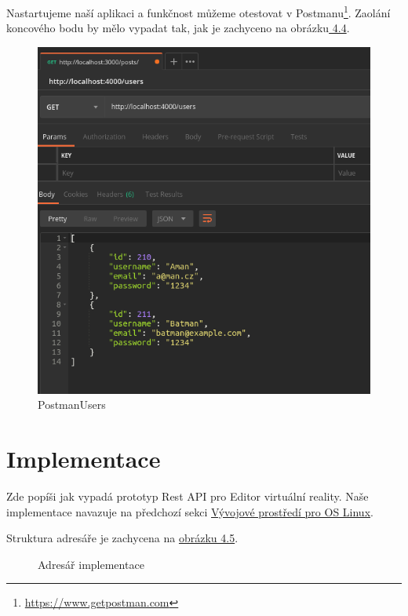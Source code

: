 \documentclass[thesis=B,czech]{FITthesis}[2012/06/26]
\begin{document}
            Nastartujeme naší aplikaci a funkčnost můžeme otestovat v Postmanu\footnote{\url{https://www.getpostman.com}}. Zaolání koncového bodu by mělo vypadat tak, jak je zachyceno na obrázku\hyperref[fig:PostmanUsers]{ 4.4}.
        \begin{figure}[h!]
            \includegraphics[width=\linewidth]{postmanUsers}
            \caption{PostmanUsers}
        \end{figure}
    \newpage
    \section{Implementace} \label{impl}
        Zde popíši jak vypadá prototyp Rest API pro Editor virtuální reality. Naše implementace navazuje na předchozí sekci \hyperref[vyvProstredi]{Vývojové prostředí pro OS Linux}.
        
        Struktura adresáře je zachycena na \hyperref[fig:adresar]{obrázku 4.5}.
        \begin{figure}[h!]
            \label{fig:adresar}
            \caption{Adresář implementace}
        \end{figure}
\end{document}
